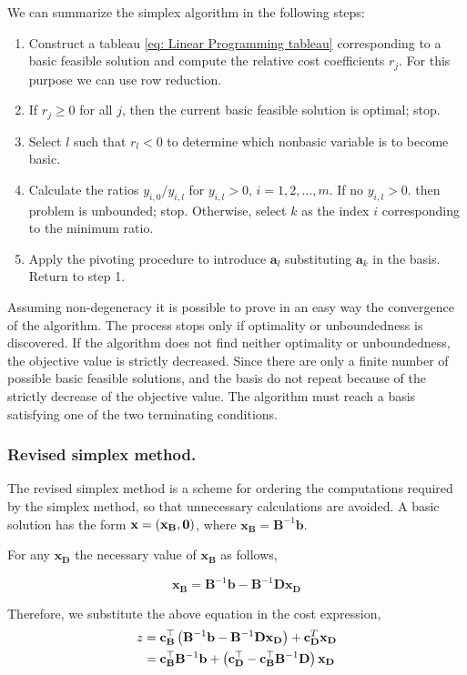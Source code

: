 We can summarize the simplex algorithm in the following steps:
\begin{enumerate}
	\item Construct a tableau \eqref{eq: Linear Programming tableau} corresponding to a basic feasible solution and compute the relative cost coefficients $r_j$. For this purpose we can use row reduction.
	\item If $r_j\geq 0$ for all $j$, then the current basic feasible solution is optimal; stop.
	\item Select $l$ such that $r_l<0$ to determine which nonbasic variable is to become basic.
	\item Calculate the ratios $y_{i,0}/y_{i,l}$ for $y_{i,l}>0$, $i=1,2,\dots, m$. If no $y_{i,l}>0$. then problem is unbounded; stop. Otherwise, select $k$ as the index $i$ corresponding to the minimum ratio. 
	\item Apply the pivoting procedure to introduce $\mathbf{a}_l$ substituting $\mathbf{a}_k$ in the basis. Return to step 1.
\end{enumerate} 
Assuming non-degeneracy it is possible to prove in an easy way the convergence of the algorithm. The process stops only if optimality or unboundedness is discovered.
If the algorithm does not find neither optimality or unboundedness, the objective value is strictly decreased. Since there are only a finite number of possible basic feasible solutions, and the basis do not repeat because of the strictly decrease of the objective value. The algorithm must reach a basis satisfying one of the two terminating conditions.
\\
\subsubsection{Revised simplex method.}
The revised simplex method is a scheme for ordering the computations required by the simplex method, so that unnecessary calculations are avoided. A basic solution has the form $\mathbf{x}=\left( \mathbf{x}_{\mathbf{B}}, \mathbf{0} \right)$, where $\mathbf{x}_\mathbf{B}=\mathbf{B}^{-1}\mathbf{b}$. 

For any $\mathbf{x}_{\mathbf{D}}$ the necessary value of $\mathbf{x}_{\mathbf{B}}$ as follows,

\begin{equation*}
	\mathbf{x}_{\mathbf{B}}=\mathbf{B}^{-1}\mathbf{b}-\mathbf{B}^{-1}\mathbf{D}\mathbf{x}_{\mathbf{D}}
\end{equation*}

Therefore, we substitute the above equation in the cost expression,
\begin{align*}
	z&=\mathbf{c}_{\mathbf{B}}^\top\left( \mathbf{B}^{-1}\mathbf{b}-\mathbf{B}^{-1}\mathbf{Dx}_{\mathbf D} \right)+\mathbf{c}_{\mathbf{D}}^T \mathbf{x}_{\mathbf D}\\
	&=\mathbf{c}_{\mathbf{B}}^\top\mathbf{B}^{-1}\mathbf{b}+\left( \mathbf{c}_{\mathbf{D}}^\top-\mathbf{c}_{\mathbf{B}}^\top\mathbf{B}^{-1}\mathbf{D} \right)\mathbf{x}_{\mathbf{D}}
\end{align*}


